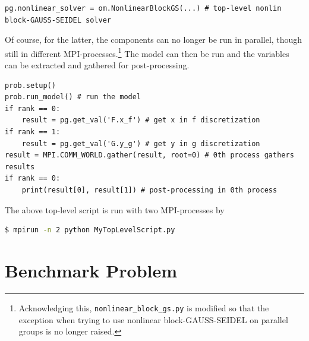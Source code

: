 \documentclass[10pt, ngerman, english,
twoside, open=right,
numbers=noenddot,
declaration=section,
abstract=section,
abstract=multiple,
abstract=notoc,
declaration=notoc,
cd=pale, 
chapterprefix=off, 
chapterpage=false, 
headingsvskip=-10em,
cdgeometry=custom, 
slantedgreek=on,
cdmath=on, 
cdfont=on,
ttfont=false,
mathswap=off,
]{tudscrreprt}
\numberwithin{equation}{chapter}
\renewcommand{\textsc}[1]{\uppercase{\mbox{#1}}}
\begin{document}
\begin{lstlisting}[firstnumber=17]
pg.nonlinear_solver = om.NonlinearBlockGS(...) # top-level nonlin block-GAUSS-SEIDEL solver
\end{lstlisting}
Of course, for the latter, the components can no longer be run in parallel, though still in different MPI-processes.\footnote{Acknowledging this, \texttt{nonlinear\_block\_gs.py} is modified so that the exception when trying to use nonlinear block-\textsc{Gau\ss}-\textsc{Seidel} on parallel groups is no longer raised.}
The model can then be run and the variables can be extracted and gathered for post-processing.
\begin{lstlisting}[firstnumber=22]
prob.setup()
prob.run_model() # run the model
if rank == 0:
	result = pg.get_val('F.x_f') # get x in f discretization
if rank == 1:
	result = pg.get_val('G.y_g') # get y in g discretization
result = MPI.COMM_WORLD.gather(result, root=0) # 0th process gathers results
if rank == 0:
	print(result[0], result[1]) # post-processing in 0th process
\end{lstlisting}
The above top-level script is run with two MPI-processes by
\begin{lstlisting}[language=bash, numbers=none]
$ mpirun -n 2 python MyTopLevelScript.py
\end{lstlisting}
\chapter{Benchmark Problem}\label{sec:Boussinesq}
\end{document}
